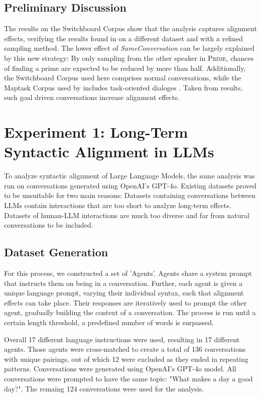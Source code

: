 \documentclass[11pt]{article}
\begin{document}
\subsection{Preliminary Discussion}
The results on the Switchboard Corpus show that the analysis captures alignment effects, verifying the results found in \citealp{reitter2008context} on a different dataset and with a refined sampling method.
The lower effect of \textit{SameConversation}
can be largely explained by this new strategy: By only sampling from the other speaker in \textsc{Prime}, chances of finding a prime are expected to be reduced by more than half. 
Additionally, the Switchboard Corpus used here comprises normal conversations, while the Maptask Corpus used by \citealp{reitter2008context} includes task-oriented dialoges \cite{anderson1991}. Taken from  results, such goal driven conversations increase alignment effects.

\section{Experiment 1: Long-Term Syntactic Alignment in LLMs}
To analyze syntactic alignment of Large Language Models, the same analysis was run on conversations generated using OpenAI's GPT-4o. Existing datasets proved to be unsuitable for two main reasons: Datasets containing conversations between LLMs contain interactions that are too short to analyze long-term effects. Datasets of human-LLM interactions are much too diverse and far from natural conversations to be included.

\subsection{Dataset Generation}
For this process, we constructed a set of 'Agents'. Agents share a system prompt that instructs them on being in a conversation. Further, each agent is given a unique language prompt, varying their individual syntax, such that alignment effects can take place. Their responses are iteratively used to prompt the other agent, gradually building the context of a conversation. The process is run until a certain length threshold, a predefined number of words is surpassed.

Overall 17 different language instructions were used, resulting in 17 different agents. Those agents were cross-matched to create a total of 136 conversations with unique pairings, out of which 12 were excluded as they ended in repeating patterns. Conversations were generated using OpenAI's GPT-4o model. All conversations were prompted to have the same topic: "What makes a day a good day?". The remaing 124 conversations were used for the analysis.
\end{document}
